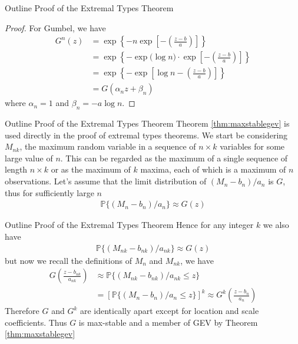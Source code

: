 \documentclass[10pt]{beamer}
\begin{document}
\begin{frame}{Outline Proof of the Extremal Types Theorem}
\begin{proof}
For Gumbel, we have
\begin{align*}
G^n(z) &= \exp\left\{-n\exp\left[-\left(\frac{z-b}{a}\right)\right]\right\} \\
&= \exp\left\{-\exp\Big(\log n\Big)\cdot\exp\left[-\left(\frac{z-b}{a}\right)\right]\right\}\\
&= \exp\left\{-\exp\left[\log n-\left(\frac{z-b}{a}\right)\right]\right\} \\
&=G(\alpha_nz+\beta_n)
\end{align*}
where $\alpha_n = 1$ and $\beta_n = -a\log n$.
\end{proof}
\end{frame}

\begin{frame}{Outline Proof of the Extremal Types Theorem}
Theorem \ref{thm:maxstablegev} is used directly in the proof of extremal types theorems. We start be considering $M_{nk}$, the maximum random variable in a sequence of $n \times k$ variables for some large value of $n$. This can be regarded as the maximum of a single sequence of length $n \times k$ or as the maximum of $k$ maxima, each of which is a maximum of $n$ observations. Let's assume that the limit distribution of $(M_n-b_n)/a_n$ is $G$, thus for sufficiently large $n$
\begin{align*}
\mathbb{P}\{(M_n-b_n)/a_n\} \approx G(z)
\end{align*}
\end{frame}

\begin{frame}{Outline Proof of the Extremal Types Theorem}
Hence for any integer $k$ we also have 
\begin{align*}
\mathbb{P}\{(M_{nk}-b_{nk})/a_{nk}\} \approx G(z)
\end{align*}
but now we recall the definitions of $M_n$ and $M_{nk}$, we have 
\begin{align*}
G\left(\frac{z-b_{nk}}{a_{nk}}\right)&\approx\mathbb{P}\{(M_{nk}-b_{nk})/a_{nk}\leq z\}\\
&=\left[\mathbb{P}\{(M_{n}-b_{n})/a_{n}\leq z\}\right]^k \approx G^k\left(\frac{z-b_n}{a_n}\right)
\end{align*}
Therefore $G$ and $G^k$ are identically apart except for location and scale coefficients. Thus $G$ is max-stable and a member of GEV by Theorem \ref{thm:maxstablegev}
\end{frame}
\end{document}
